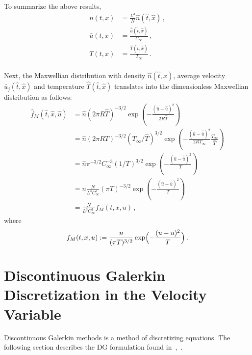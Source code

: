 \documentclass[12pt]{CSUNthesis}
\newcommand{\Tref}{T_{\infty}}
\newcommand{\Cref}{C_{\infty}}
\begin{document}
To summarize the above results,
\begin{equation}
\begin{split}
n(t,x)&=\frac{L^3 }{N} \hat{n}(\hat{t},\hat{x})\, , \nonumber  \\
\bar{u}(t,x)&=\frac{\bar{\hat{u}}(\hat{t},\hat{x})}{\Cref}\, , \nonumber \\ 
T(t,x) &= \frac{\hat{T}(\hat{t},\hat{x})}{T_{\infty}} \, . \\
\end{split}
\end{equation}

Next, the Maxwellian distribution with density $\hat{n}(\hat{t},\hat{x})$, average velocity 
$\hat{\bar{u}}_{j}(\hat{t},\hat{x})$ and temperature $\hat{T}(\hat{t},\hat{x})$ translates 
into the dimensionless Maxwellian distribution as follows:
\begin{equation}
\begin{split}
\hat{f}_{M}(\hat{t},\hat{x},\hat{u}) &= \hat{n}(2\pi R\hat{T})^{-3/2} \exp \left(- \frac{(\hat{u}-\hat{\bar{u}})^2}{2R\hat{T}}\right) \\
&= \hat{n}(2 \pi R T)^{-3/2}(\Tref / \hat{T}) ^{3/2} \exp \left(- \frac{(\hat{u}-\hat{\bar{u}})^2}{2R \Tref}\frac{\Tref}{\hat{T}}\right)\\
&= \hat{n}\pi^{-3/2} \Cref^{-3} (1/T) ^{3/2} \exp \left(- \frac{(\hat{u}-\hat{\bar{u}})^2}{T}\right)\\
&= n \frac{N}{L^3 \Cref^3} (\pi T)^{-3/2} \exp \left(- \frac{(\hat{u}-\hat{\bar{u}})^2}{T}\right)\\
&=\frac{N}{L^3 C^3_{\infty}} f_{M}(t,x,u)\, ,
\end{split}
\end{equation}
where 
\begin{equation}
f_{M}(t,x,u) :=  \frac{n}{(\pi T)^{3/2}} \exp\Bigl(-\frac{(u-\bar{u})^2}{T} \Bigr )\, . 
\end{equation}


\chapter{Discontinuous Galerkin Discretization in the Velocity Variable}
\label{chap:dg}

Discontinuous Galerkin methods is a method of discretizing equations. The following section describes the DG formulation found in~\cite{AlekseenkoJosyula2012},~\cite{AlekseenkoNguyenWood2015}.
\end{document}
